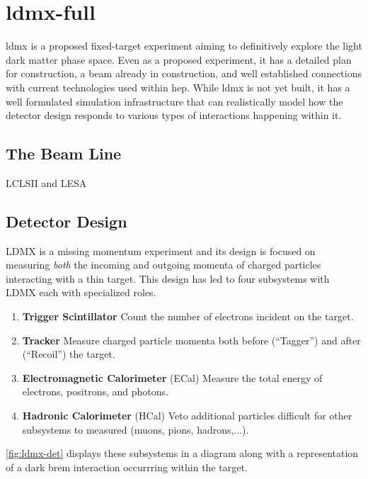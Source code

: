 \chapter{\gls{ldmx-full}}
\label{chapter:ldmx:experiment}

\gls{ldmx} is a proposed fixed-target experiment aiming to definitively explore
the light dark matter phase space. Even as a proposed experiment, it has a detailed
plan for construction, a beam already in construction, and well established connections
with current technologies used within \gls{hep}. While \gls{ldmx} is not yet built,
it has a well formulated simulation infrastructure that can realistically model
how the detector design responds to various types of interactions happening within it.

\section{The Beam Line}
LCLSII and LESA

\section{Detector Design}
LDMX is a missing momentum experiment and its design is focused on measuring
\emph{both} the incoming and outgoing momenta of charged particles interacting
with a thin target.
This design has led to four subsystems with LDMX each with specialized roles.
\begin{enumerate}
    \item \textbf{Trigger Scintillator} Count the number of electrons incident on the target.
    \item \textbf{Tracker} Measure charged particle momenta both before (``Tagger'') and after (``Recoil'') the target.
    \item \textbf{Electromagnetic Calorimeter} (ECal) Measure the total energy of electrons, positrons, and photons.
    \item \textbf{Hadronic Calorimeter} (HCal) Veto additional particles difficult for other subsystems to measured (muons, pions, hadrons,...).
\end{enumerate}
\cref{fig:ldmx-det} displays these subsystems in a diagram along with a representation of
a dark brem interaction occurrring within the target.

